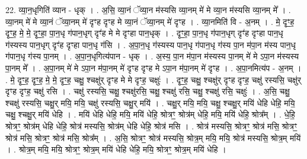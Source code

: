\documentclass[17pt]{extarticle}
\begin{document}
22. व्या॒न॒धृगिति॑ व्यान - धृक् । . अ॒सि॒ व्या॒नं ॅव्या॒न म॑स्यसि व्या॒नम् मे॑ मे व्या॒न म॑स्यसि व्या॒नम् मे᳚ । . व्या॒नम् मे॑ मे व्या॒नं ॅव्या॒नम् मे॑ दृꣳह दृꣳह मे व्या॒नं ॅव्या॒नम् मे॑ दृꣳह । . व्या॒नमिति॑ वि - अ॒नम् । . मे॒ दृꣳ॒॒ह॒ दृꣳ॒॒ह॒ मे॒ मे॒ दृꣳ॒॒हा॒ पा॒न॒धृ ग॑पान॒धृग् दृꣳ॑ह मे मे दृꣳहा पान॒धृक् । . दृꣳ॒॒हा॒ पा॒न॒धृ ग॑पान॒धृग् दृꣳ॑ह दृꣳहा पान॒धृ ग॑स्यस्य पान॒धृग् दृꣳ॑ह दृꣳहा पान॒धृ ग॑सि । . अ॒पा॒न॒धृ ग॑स्यस्य पान॒धृ ग॑पान॒धृ ग॑स्य पा॒न म॑पा॒न म॑स्य पान॒धृ ग॑पान॒धृ ग॑स्य पा॒नम् । . अ॒पा॒न॒धृगित्य॑पान - धृक् । . अ॒स्य॒ पा॒न म॑पा॒न म॑स्यस्य पा॒नम् मे॑ मे ऽपा॒न म॑स्यस्य पा॒नम् मे᳚ । . अ॒पा॒नम् मे॑ मे ऽपा॒न म॑पा॒नम् मे॑ दृꣳह दृꣳह मे ऽपा॒न म॑पा॒नम् मे॑ दृꣳह । . अ॒पा॒नमित्य॑प - अ॒नम् । . मे॒ दृꣳ॒॒ह॒ दृꣳ॒॒ह॒ मे॒ मे॒ दृꣳ॒॒ह॒ चक्षु॒ श्चक्षु॑र् दृꣳह मे मे दृꣳह॒ चक्षुः॑ । . दृꣳ॒॒ह॒ चक्षु॒ श्चक्षु॑र् दृꣳह दृꣳह॒ चक्षु॑ रस्यसि॒ चक्षु॑र् दृꣳह दृꣳह॒ चक्षु॑ रसि । . चक्षु॑ रस्यसि॒ चक्षु॒ श्चक्षु॑रसि॒ चक्षु॒ श्चक्षु॑ रसि॒ चक्षु॒ श्चक्षु॑ रसि॒ चक्षुः॑ । . अ॒सि॒ चक्षु॒ श्चक्षु॑ रस्यसि॒ चक्षु॒र् मयि॒ मयि॒ चक्षु॑ रस्यसि॒ चक्षु॒र् मयि॑ । . चक्षु॒र् मयि॒ मयि॒ चक्षु॒ श्चक्षु॒र् मयि॑ धेहि धेहि॒ मयि॒ चक्षु॒ श्चक्षु॒र् मयि॑ धेहि । . मयि॑ धेहि धेहि॒ मयि॒ मयि॑ धेहि॒ श्रोत्रꣳ॒॒ श्रोत्र॑म् धेहि॒ मयि॒ मयि॑ धेहि॒ श्रोत्र᳚म् । . धे॒हि॒ श्रोत्रꣳ॒॒ श्रोत्र॑म् धेहि धेहि॒ श्रोत्र॑ मस्यसि॒ श्रोत्र॑म् धेहि धेहि॒ श्रोत्र॑ मसि । . श्रोत्र॑ मस्यसि॒ श्रोत्रꣳ॒॒ श्रोत्र॑ मसि॒ श्रोत्रꣳ॒॒ श्रोत्र॑ मसि॒ श्रोत्रꣳ॒॒ श्रोत्र॑ मसि॒ श्रोत्र᳚म् । . अ॒सि॒ श्रोत्रꣳ॒॒ श्रोत्र॑ मस्यसि॒ श्रोत्र॒म् मयि॒ मयि॒ श्रोत्र॑ मस्यसि॒ श्रोत्र॒म् मयि॑ । . श्रोत्र॒म् मयि॒ मयि॒ श्रोत्रꣳ॒॒ श्रोत्र॒म् मयि॑ धेहि धेहि॒ मयि॒ श्रोत्रꣳ॒॒ श्रोत्र॒म् मयि॑ धेहि । \newline
\end{document}
